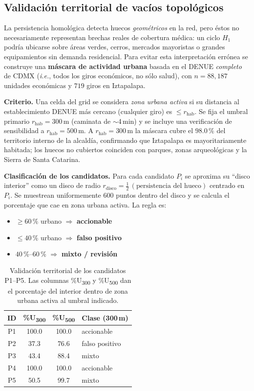 \documentclass[twocolumn, 10pt]{article}
\begin{document}
\subsection{Validación territorial de vacíos topológicos}
\label{sec:validacion}

La persistencia homológica detecta huecos \emph{geométricos} en la
red, pero éstos no necesariamente representan brechas reales de
cobertura médica: un ciclo $H_1$ podría ubicarse sobre áreas verdes,
cerros, mercados mayoristas o grandes equipamientos sin demanda
residencial. Para evitar esta interpretación errónea se construye
una \textbf{máscara de actividad urbana} basada en el DENUE
\emph{completo} de CDMX (\textit{i.e.}, todos los giros económicos,
no sólo salud), con $n=88{,}187$ unidades económicas y $719$ giros
en Iztapalapa.

\textbf{Criterio.} Una celda del grid se considera
\emph{zona urbana activa} si su distancia al establecimiento DENUE
más cercano (cualquier giro) es $\leq r_{\text{hab}}$.
Se fija el umbral primario $r_{\text{hab}}=300$\,m (caminata de
$\sim$4\,min) y se incluye una verificación de sensibilidad a
$r_{\text{hab}}=500$\,m.
A $r_{\text{hab}}=300$\,m la máscara cubre el $98.0\,\%$ del
territorio interno de la alcaldía, confirmando que Iztapalapa es
mayoritariamente habitada; los huecos no cubiertos coinciden con
parques, zonas arqueológicas y la Sierra de Santa Catarina.

\textbf{Clasificación de los candidatos.} Para cada candidato
$P_i$ se aproxima su ``disco interior'' como un disco de radio
$r_{\text{disco}}=\tfrac{1}{2}\,(\text{persistencia del hueco})$
centrado en $P_i$. Se muestrean uniformemente $600$ puntos dentro
del disco y se calcula el porcentaje que cae en zona urbana activa.
La regla es:
\begin{itemize}\itemsep0pt
  \item $\geq 60\,\%$ urbano $\Rightarrow$ \textbf{accionable}
  \item $\leq 40\,\%$ urbano $\Rightarrow$ \textbf{falso positivo}
  \item $40\,\%$--$60\,\%$ $\Rightarrow$ \textbf{mixto / revisión}
\end{itemize}

\begin{table}[H]
\centering
\small
\caption{Validación territorial de los candidatos P1--P5. Las
  columnas \%U\texorpdfstring{\textsubscript{300}}{300} y \%U\texorpdfstring{\textsubscript{500}}{500} dan el
  porcentaje del interior dentro de zona urbana activa al umbral
  indicado.}
\label{tab:validacion}
\begin{tabular}{cccl}
\toprule
\textbf{ID} & \textbf{\%U\textsubscript{300}} & \textbf{\%U\textsubscript{500}} & \textbf{Clase (300\,m)} \\
\midrule
P1 & 100.0 & 100.0 & accionable \\
P2 & 37.3  & 76.6  & falso positivo \\
P3 & 43.4  & 88.4  & mixto \\
P4 & 100.0 & 100.0 & accionable \\
P5 & 50.5  & 99.7  & mixto \\
\bottomrule
\end{tabular}
\end{table}
\end{document}
